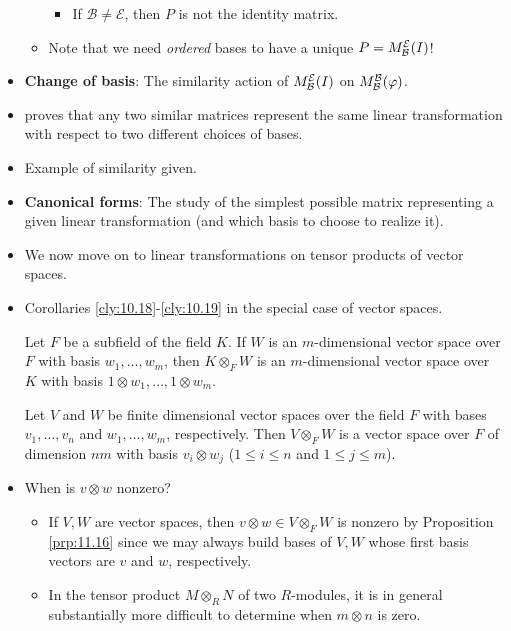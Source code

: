 \documentclass[../notes.tex]{subfiles}
\begin{document}
\begin{itemize}
\begin{itemize}
        \begin{itemize}
            \item If $\mathcal{B}\neq\mathcal{E}$, then $P$ is not the identity matrix.
        \end{itemize}
        \item Note that we need \emph{ordered} bases to have a unique $P=M_\mathcal{B}^\mathcal{E}(I)$!
    \end{itemize}
    \item \textbf{Change of basis}: The similarity action of $M_\mathcal{B}^\mathcal{E}(I)$ on $M_\mathcal{B}^\mathcal{B}(\varphi)$.
    \item \textcite{bib:DummitFoote} proves that any two similar matrices represent the same linear transformation with respect to two different choices of bases.
    \item Example of similarity given.
    \item \textbf{Canonical forms}: The study of the simplest possible matrix representing a given linear transformation (and which basis to choose to realize it).
    \item We now move on to linear transformations on tensor products of vector spaces.
    \item {}Corollaries \ref{cly:10.18}-\ref{cly:10.19} in the special case of vector spaces.
    \begin{proposition}\label{prp:11.15}
        Let $F$ be a subfield of the field $K$. If $W$ is an $m$-dimensional vector space over $F$ with basis $w_1,\dots,w_m$, then $K\otimes_FW$ is an $m$-dimensional vector space over $K$ with basis $1\otimes w_1,\dots,1\otimes w_m$.
    \end{proposition}
    \begin{proposition}\label{prp:11.16}
        Let $V$ and $W$ be finite dimensional vector spaces over the field $F$ with bases $v_1,\dots,v_n$ and $w_1,\dots,w_m$, respectively. Then $V\otimes_FW$ is a vector space over $F$ of dimension $nm$ with basis $v_i\otimes w_j$ ($1\leq i\leq n$ and $1\leq j\leq m$).
    \end{proposition}
    \item When is $v\otimes w$ nonzero?
    \begin{itemize}
        \item If $V,W$ are vector spaces, then $v\otimes w\in V\otimes_FW$ is nonzero by Proposition \ref{prp:11.16} since we may always build bases of $V,W$ whose first basis vectors are $v$ and $w$, respectively.
        \item In the tensor product $M\otimes_RN$ of two $R$-modules, it is in general substantially more difficult to determine when $m\otimes n$ is zero.

\end{itemize}
\end{itemize}
\end{document}
